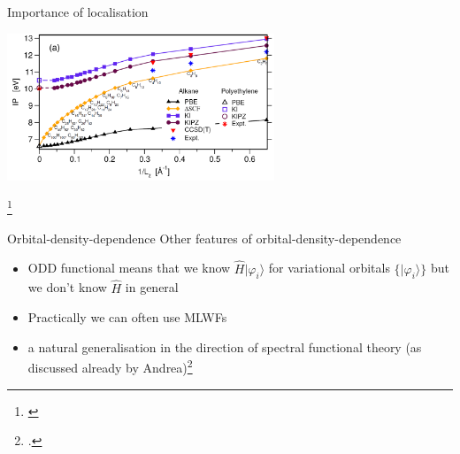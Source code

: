 \documentclass[xcolor=table,aspectratio=169]{beamer}
\newcommand\blfootcite[1]{%
  \begingroup
  \renewcommand\thefootnote{}\footnote{\hspace{-4ex}\cite{#1}}%
  \addtocounter{footnote}{-1}%
  \endgroup
}
\newcommand{\ket}[1]{|#1\rangle}
\numberwithin{equation}{section}
\begin{document}
\begin{frame}{Importance of localisation}
   \begin{center}
      \includegraphics[width=0.6\textwidth]{figures/nguyen_bulk_limit.png}
   \end{center}
   \blfootcite{Nguyen2018}

   \vspace{-2ex}

   \begin{overlayarea}{\textwidth}{0.25\textheight}

   \end{overlayarea}
\end{frame}

\begin{frame}{Orbital-density-dependence}
   Other features of orbital-density-dependence
   \begin{itemize}[<+(1)->]
      \item ODD functional means that we know $\hat H \ket{\varphi_i}$ for variational orbitals $\{\ket{\varphi_i}\}$ but we don't know $\hat H$ in general
      \item Practically we can often use MLWFs
      \item a natural generalisation in the direction of spectral functional theory (as discussed already by Andrea)\footcite{Ferretti2014}
   \end{itemize}

\end{frame}
\end{document}
